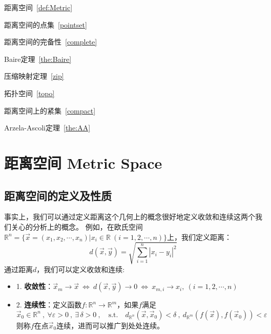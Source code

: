 \begin{introduction}
    \item 距离空间~\ref{def:Metric}
    \item 距离空间的点集~\ref{pointset}
    \item 距离空间的完备性~\ref{complete}
    \item Baire定理~\ref{the:Baire}
    \item 压缩映射定理~\ref{zip}
    \item 拓扑空间~\ref{topo}
    \item 距离空间上的紧集~\ref{compact}
    \item Arzela-Ascoli定理~\ref{the:AA}
  \end{introduction}
\section{距离空间 Metric Space}
\subsection{距离空间的定义及性质}
事实上，我们可以通过定义距离这个几何上的概念很好地定义收敛和连续这两个我们关心的分析上的概念。
例如，在欧氏空间$\mathbb{R}^n=\{\overrightarrow{x}=(x_1,x_2,\cdots,x_n)|x_i \in \mathbb{R} \ (i=1,2,\cdots,n)\}$上，我们定义距离：
\[d(\overrightarrow{x},\overrightarrow{y})=\sqrt{\sum_{i=1}^n\left|x_i-y_i\right|^2}\]
通过距离$d$，我们可以定义收敛和连续:
\begin{proposition}
\begin{itemize}
\item 1. \textbf{收敛性}：$\overrightarrow{x}_m \rightarrow \overrightarrow{x} \ \Leftrightarrow \ d(\overrightarrow{x},\overrightarrow{y}) \rightarrow 0 \ \Leftrightarrow \ x_{m,i} \rightarrow x_i, \ (i=1,2,\cdots,n)$
\item 2. \textbf{连续性}：定义函数$f:\mathbb{R}^n \rightarrow \mathbb{R}^m$，如果$f$满足
\[\overrightarrow{x}_0 \in \mathbb{R}^n\ , \ \forall \varepsilon >0 \ , \ \exists \, \delta >0 \ , \quad \text{s.t.} \quad d_{\mathbb{R}^n}(\overrightarrow{x},\overrightarrow{x}_0)<\delta \ , \ d_{\mathbb{R}^m}(f(\overrightarrow{x}),f(\overrightarrow{x}_0))<\varepsilon\]
则称$f$在点$\overrightarrow{x}_0$连续，进而可以推广到处处连续。
\end{itemize}
\end{proposition}

